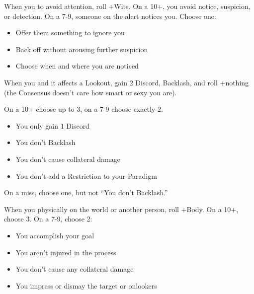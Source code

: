 \begin{multicols}{3}
  \SEPARATOR

  \begin{move}
    When you  to avoid attention, roll
    +Wits. On a 10+, you avoid notice, suspicion, or detection. On a
    7-9, someone on the alert notices you. Choose one:
    \begin{itemize}
      \setlength\itemsep{0em}
    \item Offer them something to ignore you
    \item Back off without arousing further suspicion
    \item Choose when and where you are noticed
    \end{itemize}
  \end{move}

  \SEPARATOR

  \begin{move}
    When you  and it affects a Lookout, gain
    2 Discord, Backlash, and roll +nothing (the Consensus doesn't care
    how smart or sexy you are).

    On a 10+ choose up to 3, on a 7-9 choose exactly 2.
    \begin{itemize}
      \setlength\itemsep{0em}
    \item You only gain 1 Discord
    \item You don't Backlash
    \item You don't cause collateral damage
    \item You don't add a Restriction to your Paradigm
    \end{itemize}
    On a miss, choose one, but not ``You don't Backlash.''
  \end{move}

  \columnbreak
  
  \begin{move}
    When you  physically on the world or another
    person, roll +Body. On a 10+, choose 3. On a 7-9, choose 2:
    \begin{itemize}
      \setlength\itemsep{0em}
    \item You accomplish your goal
    \item You aren't injured in the process
    \item You don't cause any collateral damage
    \item You impress or dismay the target or onlookers
    \end{itemize}
  \end{move}


\end{multicols}
